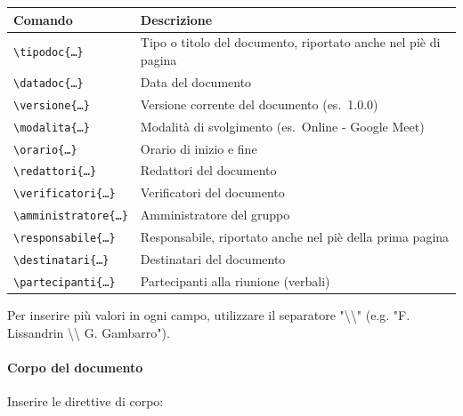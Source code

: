 \begin{center}
    \renewcommand{\arraystretch}{1.3}
    \begin{tabularx}{\textwidth}{@{} l X @{}}
        \toprule
        \textbf{Comando}                                & \textbf{Descrizione}                                           \\
        \midrule
        \texttt{\textbackslash tipodoc\{\dots\}}        & Tipo o titolo del documento, riportato anche nel piè di pagina \\
        \texttt{\textbackslash datadoc\{\dots\}}        & Data del documento                                             \\
        \texttt{\textbackslash versione\{\dots\}}       & Versione corrente del documento (es.\ 1.0.0)                   \\
        \texttt{\textbackslash modalita\{\dots\}}       & Modalità di svolgimento (es.\ Online - Google Meet)            \\
        \texttt{\textbackslash orario\{\dots\}}         & Orario di inizio e fine                                        \\
        \texttt{\textbackslash redattori\{\dots\}}      & Redattori del documento                                        \\
        \texttt{\textbackslash verificatori\{\dots\}}   & Verificatori del documento                                     \\
        \texttt{\textbackslash amministratore\{\dots\}} & Amministratore del gruppo                                      \\
        \texttt{\textbackslash responsabile\{\dots\}}   & Responsabile, riportato anche nel piè della prima pagina       \\
        \texttt{\textbackslash destinatari\{\dots\}}    & Destinatari del documento                                      \\
        \texttt{\textbackslash partecipanti\{\dots\}}   & Partecipanti alla riunione (verbali)                           \\
        \bottomrule
    \end{tabularx}
\end{center}

Per inserire più valori in ogni campo, utilizzare il separatore "\textbackslash \textbackslash" (e.g. "F. Lissandrin \textbackslash \textbackslash{ } G. Gambarro").

\paragraph{Corpo del documento}
Inserire le direttive di corpo:

